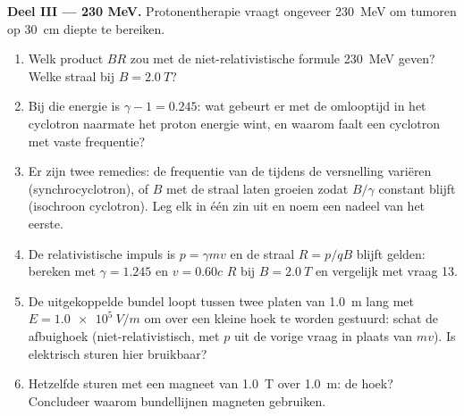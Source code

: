 \begin{problem}
\medskip
\noindent\textbf{Deel III --- 230 MeV.}
Protonentherapie vraagt ongeveer \qty{230}{MeV} om tumoren op \qty{30}{cm}
diepte te bereiken.
\begin{enumerate}[resume]
  \item Welk product $BR$ zou met de niet-relativistische formule
        \qty{230}{MeV} geven? Welke straal bij $B = \qty{2.0}{T}$?
  \item Bij die energie is $\gamma - 1 = 0.245$: wat gebeurt er met de
        omlooptijd in het cyclotron naarmate het proton energie wint, en waarom
        faalt een cyclotron met vaste frequentie?
  \item Er zijn twee remedies: de frequentie van de  tijdens de
        versnelling variëren (synchrocyclotron), of $B$ met de straal laten
        groeien zodat $B/\gamma$ constant blijft (isochroon cyclotron). Leg
        elk in één zin uit en noem een nadeel van het eerste.
  \item De relativistische impuls is $p = \gamma mv$ en de straal $R =
        p/qB$ blijft gelden: bereken met $\gamma = 1.245$ en $v = 0.60c$
        $R$ bij $B = \qty{2.0}{T}$ en vergelijk met vraag 13.
  \item De uitgekoppelde bundel loopt tussen twee platen van \qty{1.0}{m} lang
        met $E = \qty{1.0e5}{V/m}$ om over een kleine hoek te worden gestuurd:
        schat de afbuighoek (niet-relativistisch, met $p$
        uit de vorige vraag in plaats van $mv$). Is elektrisch
        sturen hier bruikbaar?
  \item Hetzelfde sturen met een magneet van \qty{1.0}{T} over \qty{1.0}{m}:
        de hoek? Concludeer waarom bundellijnen magneten gebruiken.
\end{enumerate}


\end{problem}
